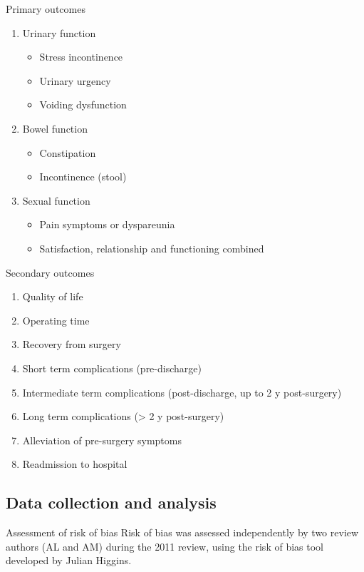 \documentclass{beamer}
\begin{document}
\begin{frame}{Primary outcomes}
    \begin{enumerate}
        \item Urinary function
            \begin{itemize}
                \item Stress incontinence
                \item Urinary urgency
                \item Voiding dysfunction
            \end{itemize}
        \item Bowel function
            \begin{itemize}
                \item Constipation
                \item Incontinence (stool)
            \end{itemize}
        \item Sexual function
            \begin{itemize}
                \item Pain symptoms or dyspareunia
                \item Satisfaction, relationship and functioning combined
            \end{itemize}
    \end{enumerate}
\end{frame}

\begin{frame}{Secondary outcomes}
    \begin{enumerate}
        \item Quality of life
        \item Operating time
        \item Recovery from surgery
        \item Short term complications (pre-discharge)
        \item Intermediate term complications (post-discharge, up to 2 y post-surgery)
        \item Long term complications (> 2 y post-surgery)
        \item Alleviation of pre-surgery symptoms
        \item Readmission to hospital
    \end{enumerate}
\end{frame}

\subsection{Data collection and analysis}
\begin{frame}{Assessment of risk of bias}
    Risk of bias was assessed independently by two review authors (AL and AM)
    during the 2011 review, using the risk of bias tool developed by Julian
    Higgins.
\end{frame}
\end{document}
